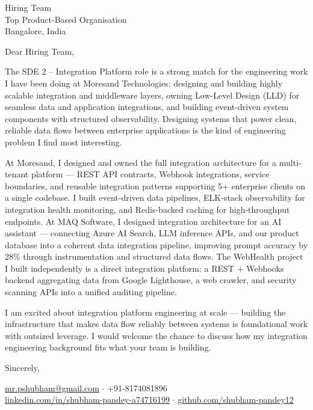 \documentclass[11pt,a4paper]{letter}
\begin{document}
\begin{letter}{Hiring Team\\Top Product-Based Organisation\\Bangalore, India}

\opening{Dear Hiring Team,}

The SDE 2 -- Integration Platform role is a strong match for the engineering work I have been doing at Moresand Technologies: designing and building highly scalable integration and middleware layers, owning Low-Level Design (LLD) for seamless data and application integrations, and building event-driven system components with structured observability. Designing systems that power clean, reliable data flows between enterprise applications is the kind of engineering problem I find most interesting.

At Moresand, I designed and owned the full integration architecture for a multi-tenant platform --- REST API contracts, Webhook integrations, service boundaries, and reusable integration patterns supporting 5+ enterprise clients on a single codebase. I built event-driven data pipelines, ELK-stack observability for integration health monitoring, and Redis-backed caching for high-throughput endpoints. At MAQ Software, I designed integration architecture for an AI assistant --- connecting Azure AI Search, LLM inference APIs, and our product database into a coherent data integration pipeline, improving prompt accuracy by 28\% through instrumentation and structured data flows. The WebHealth project I built independently is a direct integration platform: a REST + Webhooks backend aggregating data from Google Lighthouse, a web crawler, and security scanning APIs into a unified auditing pipeline.

I am excited about integration platform engineering at scale --- building the infrastructure that makes data flow reliably between systems is foundational work with outsized leverage. I would welcome the chance to discuss how my integration engineering background fits what your team is building.

\closing{Sincerely,}

\vspace{-1em}
\noindent\href{mailto:mr.pshubham@gmail.com}{mr.pshubham@gmail.com} $\cdot$ +91-8174081896\\
\href{https://linkedin.com/in/shubham-pandey-a74716199}{linkedin.com/in/shubham-pandey-a74716199} $\cdot$ \href{https://github.com/shubham-pandey12}{github.com/shubham-pandey12}

\end{letter}
\end{document}

